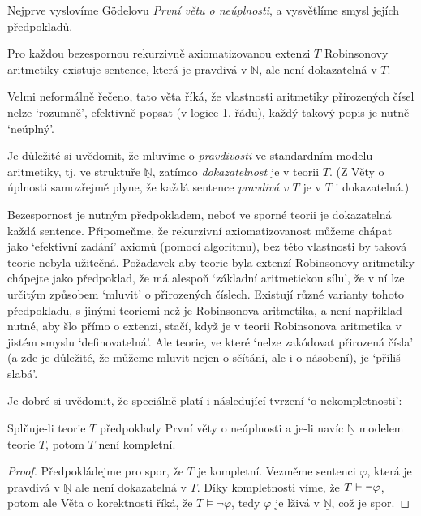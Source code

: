 Nejprve vyslovíme Gödelovu \emph{První větu o neúplnosti}, a vysvětlíme smysl jejích předpokladů.

\begin{theorem}
Pro každou bezespornou rekurzivně axiomatizovanou extenzi $T$ Robinsonovy aritmetiky existuje sentence, která je pravdivá v $\underline{\mathbb N}$, ale není dokazatelná v $T$.    
\end{theorem}

Velmi neformálně řečeno, tato věta říká, že vlastnosti aritmetiky přirozených čísel nelze `rozumně', efektivně popsat (v logice 1. řádu), každý takový popis je nutně `neúplný'. 

Je důležité si uvědomit, že mluvíme o \emph{pravdivosti} ve standardním modelu aritmetiky, tj. ve struktuře $\underline{\mathbb N}$, zatímco \emph{dokazatelnost} je v teorii $T$. (Z Věty o úplnosti samozřejmě plyne, že každá sentence \emph{pravdivá v $T$} je v $T$ i dokazatelná.)

Bezespornost je nutným předpokladem, neboť ve sporné teorii je dokazatelná každá sentence. Připomeňme, že rekurzivní axiomatizovanost můžeme chápat jako `efektivní zadání' axiomů (pomocí algoritmu), bez této vlastnosti by taková teorie nebyla užitečná. Požadavek aby teorie byla extenzí Robinsonovy aritmetiky chápejte jako předpoklad, že má alespoň `základní aritmetickou sílu', že v ní lze určitým způsobem `mluvit' o přirozených číslech. Existují různé varianty tohoto předpokladu, s jinými teoriemi než je Robinsonova aritmetika, a není například nutné, aby šlo přímo o extenzi, stačí, když je v teorii Robinsonova aritmetika v jistém smyslu `definovatelná'. Ale teorie, ve které `nelze zakódovat přirozená čísla' (a zde je důležité, že můžeme mluvit nejen o sčítání, ale i o násobení), je `příliš slabá'.

Je dobré si uvědomit, že speciálně platí i následující tvrzení `o nekompletnosti':

\begin{corollary}
    Splňuje-li teorie $T$ předpoklady První věty o neúplnosti a je-li navíc $\underline{\mathbb N}$ modelem teorie $T$, potom $T$ není kompletní.
\end{corollary}
\begin{proof}
    Předpokládejme pro spor, že $T$ je kompletní. Vezměme sentenci $\varphi$, která je pravdivá v $\underline{\mathbb N}$ ale není dokazatelná v $T$. Díky kompletnosti víme, že $T\vdash\neg\varphi$, potom ale Věta o korektnosti říká, že  $T\models\neg\varphi$, tedy $\varphi$ je lživá v $\underline{\mathbb N}$, což je spor.
\end{proof}

